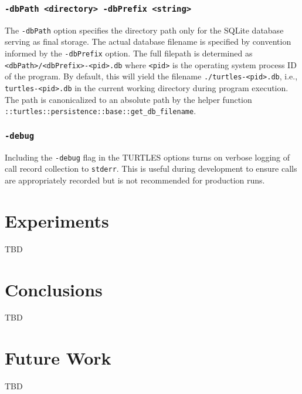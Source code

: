\documentclass{article}[letter,10pt]
\begin{document}
{{    \subsubsection{\texttt{-dbPath <directory> -dbPrefix <string>}}{
      The \texttt{-dbPath} option specifies the directory path only for the SQLite database serving
      as final storage. The actual database filename is specified by convention
      informed by the \texttt{-dbPrefix} option. The full filepath is
      determined as \texttt{<dbPath>/<dbPrefix>-<pid>.db} where \texttt{<pid>}
      is the operating system process ID of the program. By default, this will
      yield the filename \texttt{./turtles-<pid>.db}, i.e., \texttt{turtles-<pid>.db}
      in the current working directory during program execution. The path is canonicalized
      to an absolute path by the helper function \texttt{::turtles::persistence::base::get\_db\_filename}.
    }
    \subsubsection{\texttt{-debug}}{
      Including the \texttt{-debug} flag in the TURTLES options turns on verbose logging
      of call record collection to \texttt{stderr}. This is useful during development to
      ensure calls are appropriately recorded but is not recommended for production runs.
    }
  }
}

\section{Experiments}{
  TBD
}

\section{Conclusions}{
  TBD
}

\section{Future Work}{
  TBD
}

\printbibliography
\end{document}
